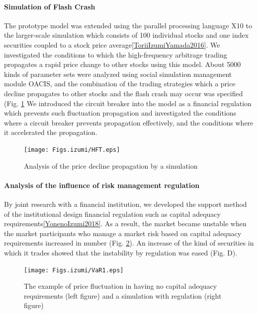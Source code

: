 \paragraph{Simulation of Flash Crash}

The prototype model was extended using the parallel processing
language X10 to the larger-scale simulation which consists of 100
individual stocks and one index securities coupled to a stock price
average\ref{ToriiIzumiYamada2016}.  We investigated the conditions to
which the high-frequency arbitrage trading propagates a rapid price
change to other stocks using this model.  About 5000 kinds of
parameter sets were analyzed using social simulation management module
OACIS, and the combination of the trading strategies which a price
decline propagates to other stocks and the flash crash may occur was
specified (Fig. \ref{fig:Figs.izumi/hft.eps} We introduced the circuit
breaker into the model as a financial regulation which prevents such
fluctuation propagation and investigated the conditions where a
circuit breaker prevents propagation effectively, and the conditions
where it accelerated the propagation.

\begin{figure}[htb]
  \centering
  \texttt{[image: Figs.izumi/HFT.eps]}
  \caption{Analysis of the price decline propagation by a simulation}
  \label{fig:Figs.izumi/hft.eps}
\end{figure}


\paragraph{Analysis of the influence of risk management regulation}

By joint research with a financial institution, we developed the
support method of the institutional design financial regulation such
as capital adequacy requirements\ref{YonenoIzumi2018}.  As a result,
the market became unstable when the market participants who manage a
market risk based on capital adequacy requirements increased in number
(Fig. \ref{fig:Figs.izumi/var1.eps}).  An increase of the kind of
securities in which it trades showed that the instability by
regulation was eased (Fig. D).

\begin{figure}[htb]
  \centering
  \texttt{[image: Figs.izumi/VaR1.eps]}
  \caption{The example of price fluctuation in having no capital adequacy requirements (left figure) and a simulation with regulation (right figure)}
  \label{fig:Figs.izumi/var1.eps}
\end{figure}

